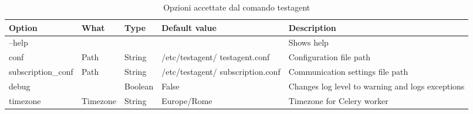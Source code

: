 \begin{table}[hbtp]
\begin{tabulary}{\textwidth}{L|L|L|L|L}
\hline
Option & What & Type & Default value & Description \\
\hline\hline
--help & & & & Shows help \\
\hline
conf & Path & String & /etc/testagent/ testagent.conf & Configuration file path\\
\hline
subscription\_conf & Path & String\  & /etc/testagent/ subscription.conf & Communication settings file path\\
\hline
debug & & Boolean & False & Changes log level to warning and logs exceptions\\
\hline
timezone & Timezone & String & Europe/Rome & Timezone for Celery worker\\
\hline
\end{tabulary}
\caption{Opzioni accettate dal comando testagent}
\label{TaOptions}
\end{table}